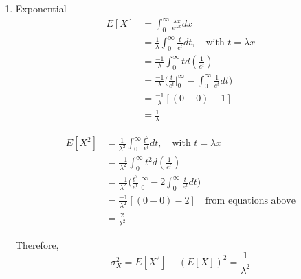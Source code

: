 \documentclass[UTF8]{article}
\begin{document}
    \begin{enumerate}
        \item Exponential
        \begin{equation*}
          \begin{split}
             E[X] & = \int_{0}^{\infty}\frac{\lambda x}{e^{\lambda x}}dx\\
               & = \frac{1}{\lambda}\int_{0}^{\infty}\frac{t}{e^t}dt,\quad\text{with $t=\lambda x$}\\
               &=\frac{-1}{\lambda}\int_{0}^{\infty}td(\frac{1}{e^t})\\
               & =\frac{-1}{\lambda}\bigg(\frac{t}{e^t}\bigg|^\infty_0-\int_{0}^{\infty}\frac{1}{e^t}dt\bigg)\\
               &=\frac{-1}{\lambda}[(0-0)-1]\\
               &=\frac{1}{\lambda}
          \end{split}
        \end{equation*}

        \begin{equation*}
          \begin{split}
             E[X^2] &=\frac{1}{\lambda^2}\int_{0}^{\infty}\frac{t^2}{e^t}dt,\quad\text{with $t=\lambda x$}\\
               &=\frac{-1}{\lambda^2}\int_{0}^{\infty}t^2d(\frac{1}{e^t})\\
               &=\frac{-1}{\lambda^2}\bigg(\frac{t^2}{e^t}\bigg|^\infty_0-2\int_{0}^{\infty}\frac{t}{e^t}dt\bigg)\\
               &=\frac{-1}{\lambda^2}[(0-0)-2]\quad\text{from equations above}\\
               &=\frac{2}{\lambda^2}
          \end{split}
        \end{equation*}

        Therefore, 
        \begin{equation*}
            \sigma^2_X= E[X^2]-(E[X])^2=\frac{1}{\lambda^2}
        \end{equation*}


\end{enumerate}
\end{document}
